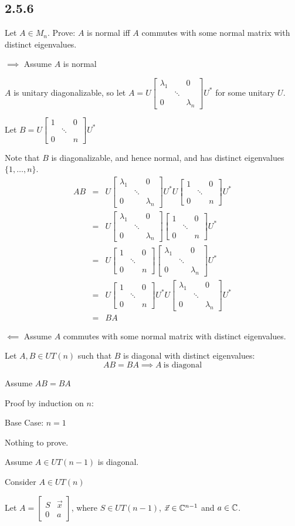 \documentclass[letterpaper,12pt,fleqn]{article}
\renewcommand{\l}{\lambda}
\newcommand{\vx}{\vec{x}}
\renewcommand{\l}{\lambda}
\newcommand{\diag}[2]{\begin{bmatrix} #1 & & 0 \\ & \ddots & \\ 0 & & #2 \end{bmatrix}}
\begin{document}
\subsection*{2.5.6}

Let $A\in M_n$. Prove: $A$ is normal iff $A$ commutes with some normal matrix with
distinct eigenvalues.

\begin{description}
\item $\implies$ Assume $A$ is normal

  \newcommand{\mm}{\diag{1}{n}}
  \newcommand{\mn}{\diag{\l_1}{\l_n}}

  $A$ is unitary diagonalizable, so let $A=U\mn U^*$ for some unitary $U$.

  Let $B=U\mm U^*$

  Note that $B$ is diagonalizable, and hence normal, and has distinct eigenvalues
  $\{1,\ldots,n\}$.
  \begin{eqnarray*}
    AB &=& U\mn U^*U\mm U^* \\
    &=& U\mn\mm U^* \\
    &=& U\mm\mn U^* \\
    &=& U\mm U^*U\mn U^* \\
    &=& BA
  \end{eqnarray*}

\item $\impliedby$ Assume $A$ commutes with some normal matrix with distinct eigenvalues.

  \begin{lemma}
    Let $A,B\in UT(n)$ such that $B$ is diagonal with distinct eigenvalues:
    \[AB=BA\implies A\ \mbox{is diagonal}\]
  \end{lemma}

  \begin{theproof}
    Assume $AB=BA$

    Proof by induction on $n$:

    \begin{description}
    \item Base Case: $n=1$

      Nothing to prove.

    \item Assume $A\in UT(n-1)$ is diagonal.

    \item Consider $A\in UT(n)$

      Let $A=\left[\begin{array}{c|c} S & \vx \\ \hline 0 & a \end{array}\right]$, where
      $S\in UT(n-1)$, $\vx\in\C^{n-1}$ and $a\in\mathbb{C}$.


\end{description}
\end{theproof}
\end{description}
\end{document}
